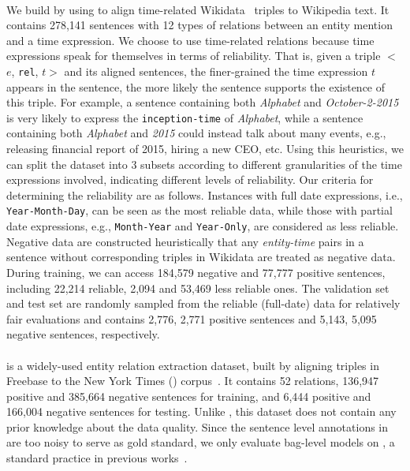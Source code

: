 \paragraph{\TimeRE}
We build \TimeRE by
using \DS to align time-related Wikidata~\cite{vrandevcic2014wikidata} \KB triples to
Wikipedia text. It contains 278,141 sentences with 12
types of relations  between an entity mention and a time expression.
We choose to use time-related relations because time expressions speak for themselves in
terms of reliability. That is, given a \KB triple $<$$e$, \texttt{rel}, $t$$>$ and its
aligned sentences,  the  finer-grained the time expression $t$ appears in the sentence,
the more likely the sentence  supports the existence of this triple.
For example, a sentence containing both \emph{Alphabet} and \emph{October-2-2015} is very likely to express the \texttt{inception-time} of \emph{Alphabet}, while a sentence containing both \emph{Alphabet} and \emph{2015} could instead talk  about many events, e.g.,  releasing financial report of 2015, hiring a new CEO, etc.
Using this heuristics, we can split the dataset into
3 subsets according to different granularities of the time expressions involved, indicating different levels of reliability.
Our criteria for determining the reliability are as follows.
Instances with full date expressions, i.e., \texttt{Year-Month-Day}, can be seen as the most reliable data, while those with
partial date expressions, e.g., \texttt{Month-Year} and \texttt{Year-Only}, are considered as less
reliable.  Negative data are constructed  heuristically that any
\emph{entity-time} pairs in a sentence without corresponding triples in Wikidata are treated as negative data.
During training, we can access  184,579 negative
 and  77,777 positive sentences, including 22,214 reliable, 
2,094 and 53,469 less reliable ones. The validation set and test set are randomly sampled from
the reliable (full-date) data for relatively fair evaluations and contains
2,776, 2,771 positive sentences and 5,143, 5,095 negative sentences, respectively.


\paragraph{\EntityRE} is a widely-used entity
relation extraction dataset, built %
by aligning triples
in Freebase to the New York Times (\NYT) corpus~\cite{riedel2010modeling}. 
It contains 52 relations, 136,947 positive and 385,664 negative sentences for training, and 6,444 positive and 166,004 negative sentences  for testing.
Unlike \TimeRE, this dataset does not contain any prior knowledge about the data quality.
Since the sentence level annotations in %
 \EntityRE are too noisy to serve as gold standard,  we only evaluate bag-level models on \EntityRE, a standard practice in previous works~\cite{surdeanu2012multi,zeng2015distant,lin2016neural}.


